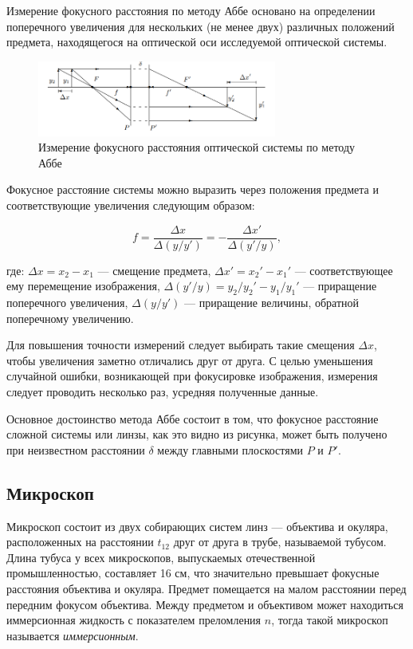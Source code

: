 Измерение фокусного расстояния по методу Аббе основано на определении поперечного увеличения для нескольких (не менее двух) различных положений предмета, находящегося на оптической оси исследуемой оптической системы.

\begin{figure}[h]
\centering
\includegraphics[width=0.7\textwidth]{images/abbe_method.png}
\caption{Измерение фокусного расстояния оптической системы по методу Аббе}
\label{fig:abbe}
\end{figure}

Фокусное расстояние системы можно выразить через положения предмета и соответствующие увеличения следующим образом:

\begin{equation}
f = \frac{\Delta x}{\Delta (y/y')} = -\frac{\Delta x'}{\Delta (y'/y)},
\label{eq:abbe}
\end{equation}

где:
$\Delta x = x_2 - x_1$ — смещение предмета,
$\Delta x' = x_2' - x_1'$ — соответствующее ему перемещение изображения,
$\Delta (y'/y) = y_2 / y_2' - y_1 / y_1'$ — приращение поперечного увеличения,
$\Delta (y/y')$ — приращение величины, обратной поперечному увеличению.

Для повышения точности измерений следует выбирать такие смещения $\Delta x$, чтобы увеличения заметно отличались друг от друга. С целью уменьшения случайной ошибки, возникающей при фокусировке изображения, измерения следует проводить несколько раз, усредняя полученные данные.

Основное достоинство метода Аббе состоит в том, что фокусное расстояние сложной системы или линзы, как это видно из рисунка, может быть получено при неизвестном расстоянии $\delta$ между главными плоскостями $P$ и $P'$.
\subsection*{Микроскоп}

Микроскоп состоит из двух собирающих систем линз — объектива и окуляра, расположенных на расстоянии $t_{12}$ друг от друга в трубе, называемой тубусом. Длина тубуса у всех микроскопов, выпускаемых отечественной промышленностью, составляет 16 см, что значительно превышает фокусные расстояния объектива и окуляра. Предмет помещается на малом расстоянии перед передним фокусом объектива. Между предметом и объективом может находиться иммерсионная жидкость с показателем преломления $n$, тогда такой микроскоп называется \textit{иммерсионным}.

